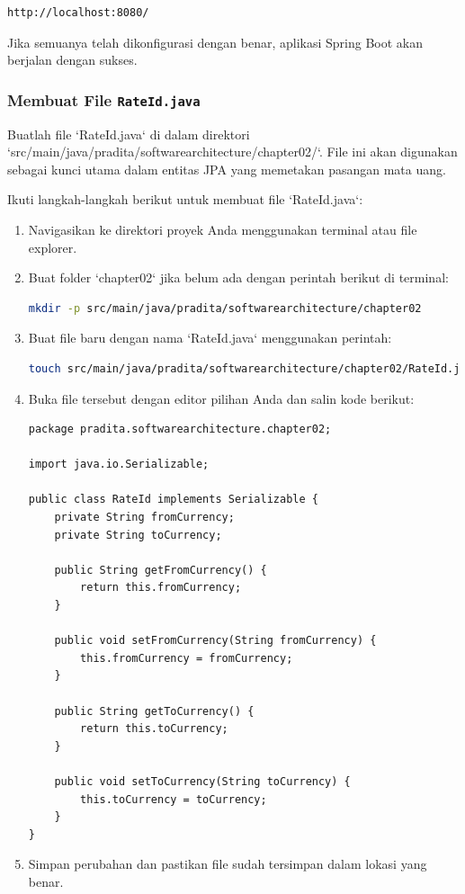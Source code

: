 \begin{lstlisting}
http://localhost:8080/
\end{lstlisting}

Jika semuanya telah dikonfigurasi dengan benar, aplikasi Spring Boot akan berjalan dengan sukses.


\subsubsection{Membuat File \texttt{RateId.java}}
Buatlah file `RateId.java` di dalam direktori `src/main/java/pradita/softwarearchitecture/chapter02/`. File ini akan digunakan sebagai kunci utama dalam entitas JPA yang memetakan pasangan mata uang.

Ikuti langkah-langkah berikut untuk membuat file `RateId.java`:

\begin{enumerate}
\item Navigasikan ke direktori proyek Anda menggunakan terminal atau file explorer.
\item Buat folder `chapter02` jika belum ada dengan perintah berikut di terminal:

\begin{lstlisting}[language=bash]
mkdir -p src/main/java/pradita/softwarearchitecture/chapter02
\end{lstlisting}

\item Buat file baru dengan nama `RateId.java` menggunakan perintah:

\begin{lstlisting}[language=bash]
touch src/main/java/pradita/softwarearchitecture/chapter02/RateId.java
\end{lstlisting}

\item Buka file tersebut dengan editor pilihan Anda dan salin kode berikut:

\begin{lstlisting}[style=JavaStyle]
package pradita.softwarearchitecture.chapter02;

import java.io.Serializable;

public class RateId implements Serializable {
	private String fromCurrency;
	private String toCurrency;
	
	public String getFromCurrency() {
		return this.fromCurrency;
	}
	
	public void setFromCurrency(String fromCurrency) {
		this.fromCurrency = fromCurrency;
	}
	
	public String getToCurrency() {
		return this.toCurrency;
	}
	
	public void setToCurrency(String toCurrency) {
		this.toCurrency = toCurrency;
	}
}
\end{lstlisting}

\item Simpan perubahan dan pastikan file sudah tersimpan dalam lokasi yang benar.
\end{enumerate}

